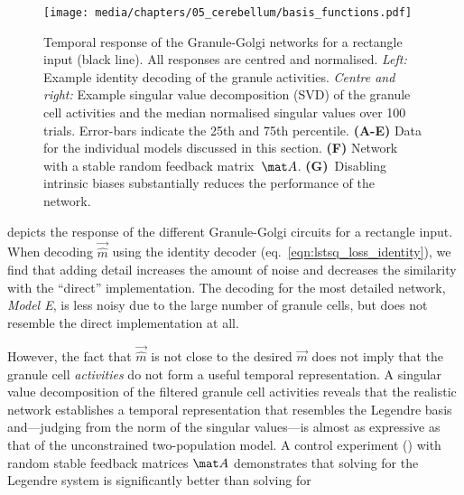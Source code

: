 \begin{figure}
	\centering
    \texttt{[image: media/chapters/05\_cerebellum/basis\_functions.pdf]}%
    {\label{fig:cerebellum_basis_functions_a}}%
    {\label{fig:cerebellum_basis_functions_b}}%
    {\label{fig:cerebellum_basis_functions_c}}%
    {\label{fig:cerebellum_basis_functions_d}}%
    {\label{fig:cerebellum_basis_functions_e}}%
    {\label{fig:cerebellum_basis_functions_f}}%
    {\label{fig:cerebellum_basis_functions_g}}%
    \vspace{0.5em}
    \caption[Temporal response of the Granule-Golgi networks]{
    	Temporal response of the Granule-Golgi networks for a rectangle input (black line).
    	All responses are centred and normalised.
    	\emph{Left:} Example identity decoding of the granule activities.
    	\emph{Centre and right:} Example singular value decomposition (SVD) of the granule cell activities and the median normalised singular values over \num{100} trials. Error-bars indicate the 25th and 75th percentile.
    	\textbf{(A-E)} Data for the individual models discussed in this section.
    	\textbf{(F)} Network with a stable random feedback matrix~$\mat A$.
    	\textbf{(G)}~Disabling intrinsic biases substantially reduces the performance of the network.
    }
    \label{fig:cerebellum_basis_functions}
\end{figure}

 depicts the response of the different Granule-Golgi circuits for a rectangle input.
When decoding $\vec{\hat m}$ using the identity decoder (eq.~\ref{eqn:lstsq_loss_identity}), we find that adding detail increases the amount of noise and decreases the similarity with the \enquote{direct} implementation.
The decoding for the most detailed network, \emph{Model E}, is less noisy due to the large number of granule cells, but does not resemble the direct implementation at all.

However, the fact that $\vec{\hat m}$ is not close to the desired $\vec m$ does not imply that the granule cell \emph{activities} do not form a useful temporal representation.
A singular value decomposition of the filtered granule cell activities reveals that the realistic network establishes a temporal representation that resembles the Legendre basis and---judging from the norm of the singular values---is almost as expressive as that of the unconstrained two-population model.
A control experiment () with random stable feedback matrices $\mat A$ demonstrates that solving for the Legendre system is significantly better than solving for 

